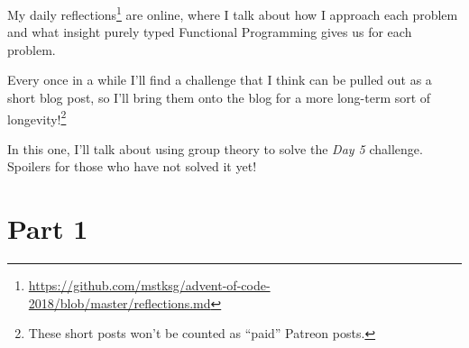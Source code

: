 \documentclass[]{article}
\renewcommand{\href}[2]{#2\footnote{\url{#1}}}
\begin{document}
My
\href{https://github.com/mstksg/advent-of-code-2018/blob/master/reflections.md}{daily
reflections} are online, where I talk about how I approach each problem and what
insight purely typed Functional Programming gives us for each problem.

Every once in a while I'll find a challenge that I think can be pulled out as a
short blog post, so I'll bring them onto the blog for a more long-term sort of
longevity!\footnote{These short posts won't be counted as ``paid'' Patreon
  posts.}

In this one, I'll talk about using group theory to solve the \emph{Day 5}
challenge. Spoilers for those who have not solved it yet!

\section{Part 1}\label{part-1}
\end{document}
